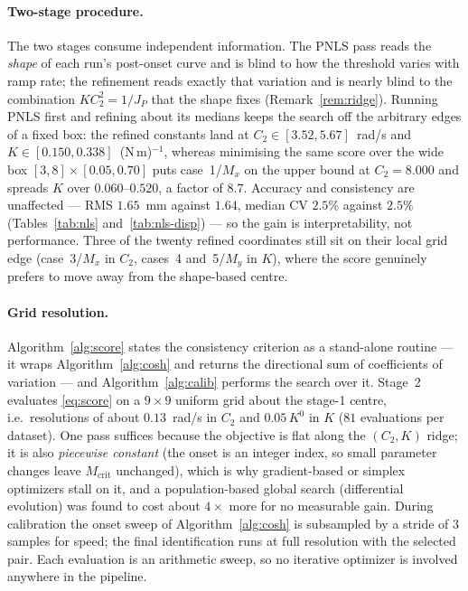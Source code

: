 \documentclass[10pt]{article}
\begin{document}
\paragraph{Two-stage procedure.}
The two stages consume independent information. The PNLS pass reads the
\emph{shape} of each run's post-onset curve and is blind to how the
threshold varies with ramp rate; the refinement reads exactly that
variation
and is nearly blind to the combination $K C_2^2 = 1/J_P$ that the shape
fixes (Remark~\ref{rem:ridge}). Running PNLS first and refining about its medians
keeps the search off the arbitrary edges of a fixed box: the refined
constants land at $C_2 \in [3.52, 5.67]$~rad/s and
$K \in [0.150, 0.338]$~(N\,m)$^{-1}$, whereas minimising the same score
over the wide box $[3,8]\times[0.05,0.70]$ puts case~1/$M_x$ on the
upper bound at $C_2 = 8.000$ and spreads $K$ over $0.060$--$0.520$, a
factor of $8.7$. Accuracy and consistency are unaffected --- RMS
$1.65$~mm against $1.64$, median CV $2.5\%$ against $2.5\%$
(Tables~\ref{tab:nls} and~\ref{tab:nls-disp}) --- so the gain is
interpretability, not performance. Three of the twenty refined
coordinates still sit on their local grid edge (case~3/$M_x$ in $C_2$,
cases~4 and~5/$M_y$ in $K$), where the score genuinely prefers to move
away from the shape-based centre.

\paragraph{Grid resolution.}
Algorithm~\ref{alg:score} states the consistency criterion as a
stand-alone routine — it wraps Algorithm~\ref{alg:cosh} and returns the
directional sum of coefficients of variation — and
Algorithm~\ref{alg:calib} performs the search over it. Stage~2
evaluates \eqref{eq:score} on a $9 \times 9$ uniform grid about the
stage-1 centre, i.e.\ resolutions of about $0.13$~rad/s in $C_2$ and
$0.05\,K^{0}$ in $K$ ($81$ evaluations per dataset). One pass suffices
because the objective is flat along
the $(C_2, K)$ ridge; it is also \emph{piecewise constant} (the onset
is an integer index, so small parameter changes leave
$M_{\mathrm{crit}}$ unchanged), which is why gradient-based or simplex
optimizers stall on it, and a population-based global search
(differential evolution) was found to cost about $4\times$ more for no
measurable gain. During calibration the onset sweep of
Algorithm~\ref{alg:cosh} is subsampled by a stride of $3$ samples for
speed; the final identification runs at full resolution with the
selected pair. Each evaluation is an arithmetic sweep, so no iterative
optimizer is involved anywhere in the pipeline.
\end{document}
